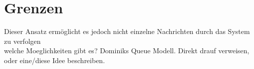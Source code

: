 \section{Grenzen}
Dieser Ansatz ermöglicht es jedoch nicht einzelne Nachrichten durch das System zu verfolgen\\

welche Moeglichkeiten gibt es? Dominiks Queue Modell. Direkt drauf verweisen, oder eine/diese Idee beschreiben.\\




